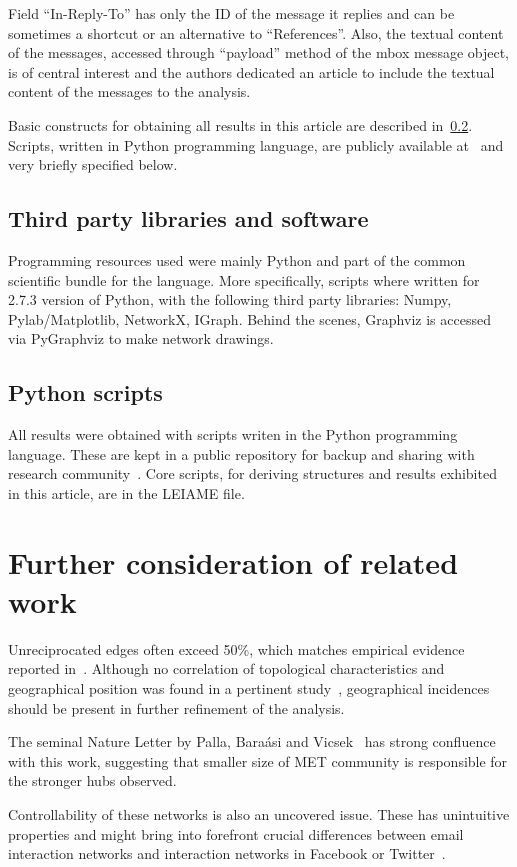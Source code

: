 \documentclass[%
 aip,
 jmp,%
 amsmath,amssymb,
 reprint,%
]{revtex4-1}
\begin{document}
Field ``In-Reply-To'' has only the ID of the message it replies and can be sometimes
a shortcut or an alternative to ``References''. Also, the textual content of the messages,
accessed through ``payload'' method of the mbox message object, is of central interest and
the authors dedicated an article to include the textual content of the messages to the analysis.

Basic constructs for obtaining all results in this article are described in~\ref{ap:os}. Scripts, written in Python programming language, are publicly available at~\cite{scriptsFim} and very briefly specified below.

\subsection{Third party libraries and software}
Programming resources used were mainly Python and part of the
common scientific bundle for the language. More specifically,
scripts where written for 2.7.3 version of Python,
with the following third party libraries: Numpy, Pylab/Matplotlib, NetworkX, IGraph.
Behind the scenes, Graphviz is accessed via PyGraphviz to make network drawings.

\subsection{Python scripts}\label{ap:os}
All results were obtained with scripts writen in the Python programming language. These are kept in a public repository for backup and sharing with research community~\cite{scriptsFim}. Core scripts, for deriving structures and results exhibited in this article, are in the LEIAME file.
\section{Further consideration of related work}\label{sec:fure}
Unreciprocated edges often exceed 50\%, which matches empirical evidence reported in~\cite{newmanEvolving}. Although no correlation of topological characteristics and geographical position was found in a pertinent study~\cite{barabasiGeo}, geographical incidences should be present in further refinement of the analysis.

The seminal Nature Letter by Palla, Bara{\'a}si and Vicsek~\cite{barabasiEvo} has strong confluence with this work, suggesting that smaller size of MET community is responsible for the stronger hubs observed.

Controllability of these networks is also an uncovered issue. These has unintuitive properties and might bring into forefront crucial differences between email interaction networks and interaction networks in Facebook or Twitter~\cite{barabasiControlCapacity,barabasiControlCentrality,barabasiControllability}.
\end{document}
